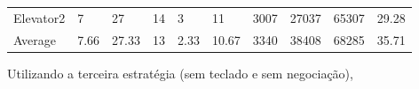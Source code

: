\documentclass[a4paper]{article}
\begin{document}
\begin{table}[h]
\begin{tabular}{@{}llllllllll@{}}
Elevator2 & 7        & 27            & 14           & 3                                                               & 11                                                                  & 3007                                                         & 27037                                                 & 65307                                                   & 29.28         \\
Average   & 7.66     & 27.33         & 13        & 2.33                                                               & 10.67 & 3340                                                         & 38408                                                 & 68285                                                   & 35.71          \\ \bottomrule
\end{tabular}
\end{table}

Utilizando a terceira estratégia (sem teclado e sem negociação),
\end{document}
